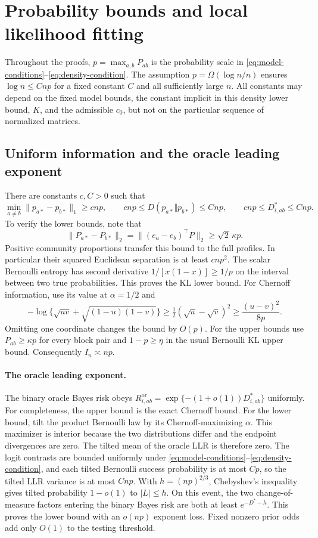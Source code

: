 \section{Probability bounds and local likelihood fitting}
\label{app:statistical-proofs}

Throughout the proofs, $p=\max_{a,b}P_{ab}$ is the probability scale in \eqref{eq:model-conditions}--\eqref{eq:density-condition}. The assumption $p=\Omega(\log n/n)$ ensures $\log n\le Cnp$ for a fixed constant $C$ and all sufficiently large $n$. All constants may depend on the fixed model bounds, the constant implicit in this density lower bound, $K$, and the admissible $c_0$, but not on the particular sequence of normalized matrices.

\subsection{Uniform information and the oracle leading exponent}
\label{app:uniform-density-bounds}

There are constants $c,C>0$ such that
\begin{equation}
 \min_{a\ne b}\|p_{a*}-p_{b*}\|_1\ge cnp,
 \qquad
 cnp\le D(p_{a*}\Vert p_{b*})\le Cnp,
 \qquad
 cnp\le D^*_{i,ab}\le Cnp.
 \label{eq:uniform-information-scale}
\end{equation}
To verify the lower bounds, note that
\[
 \|P_{a*}-P_{b*}\|_2
 =\|(e_a-e_b)^\top P\|_2
 \ge\sqrt2\,\kappa p.
\]
Positive community proportions transfer this bound to the full
profiles.  In particular their squared Euclidean separation is at
least $cnp^2$.  The scalar Bernoulli entropy has second
derivative $1/[x(1-x)]\ge1/p$ on the interval between two
true probabilities.  This proves the KL lower bound.  For Chernoff
information, use its value at $\alpha=1/2$ and
\[
 -\log\{\sqrt{uv}+\sqrt{(1-u)(1-v)}\}
 \ge\tfrac12(\sqrt u-\sqrt v)^2
 \ge\frac{(u-v)^2}{8p}.
\]
Omitting one coordinate changes the bound by $O(p)$.
For the upper bounds use $P_{ab}\ge\kappa p$ for every block pair and
$1-p\ge\eta$ in the usual Bernoulli KL upper bound.
Consequently $I_n\asymp np$.

\paragraph{The oracle leading exponent.}
The binary oracle Bayes risk obeys
$R^{\mathrm{or}}_{i,ab}=\exp\{-(1+o(1))D^*_{i,ab}\}$ uniformly.
For completeness, the upper bound is the exact Chernoff bound.
For the lower bound, tilt the product Bernoulli law by its
Chernoff-maximizing $\alpha$.  This maximizer is interior because
the two distributions differ and the endpoint divergences are zero.
The tilted mean of the oracle LLR is therefore zero.  The logit
contrasts are bounded uniformly under
\eqref{eq:model-conditions}--\eqref{eq:density-condition}, and each tilted Bernoulli
success probability is at most $Cp$, so the tilted LLR
variance is at most $Cnp$.  With $h=(np)^{2/3}$, Chebyshev's inequality
gives tilted probability $1-o(1)$ to $|L|\le h$.  On this event,
the two change-of-measure factors entering the binary Bayes risk
are both at least $e^{-D^*-h}$.  This proves the lower bound with
an $o(np)$ exponent loss.  Fixed nonzero prior odds add only $O(1)$
to the testing threshold.

